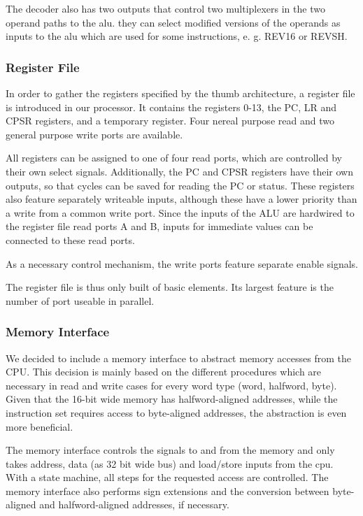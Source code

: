 The decoder also has two outputs that control two multiplexers in the two operand paths to the alu. they can select modified versions of the operands as inputs to the alu which are used for some instructions, e. g. REV16 or REVSH.

\subsubsection{Register File}
\label{subsubsec:regfisterfile}
In order to gather the registers specified by the thumb architecture, a register file is introduced in our processor. It contains the registers 0-13, the PC, LR and CPSR registers, and a temporary register. Four nereal purpose read and two general purpose write ports are available.

All registers can be assigned to one of four read ports, which are controlled by their own select signals. Additionally, the PC and CPSR registers have their own outputs, so that cycles can be saved for reading the PC or status. These registers also feature separately writeable inputs, although these have a lower priority than a write from a common write port.
Since the inputs of the ALU are hardwired to the register file read ports A and B, inputs for immediate values can be connected to these read ports.

As a necessary control mechanism, the write ports feature separate enable signals. 

The register file is thus only built of basic elements. Its largest feature is the number of port useable in parallel. 

\subsubsection{Memory Interface}
\label{subsubsec:memoryinterface}
We decided to include a memory interface to abstract memory accesses from the CPU. This decision is mainly based on the different procedures which are necessary in read and write cases for every word type (word, halfword, byte). Given that the 16-bit wide memory has halfword-aligned addresses, while the instruction set requires access to byte-aligned addresses, the abstraction is even more beneficial. 

The memory interface controls the signals to and from the memory and only takes address, data (as 32 bit wide bus) and load/store inputs from the cpu. With a state machine, all steps for the requested access are controlled. The memory interface also performs sign extensions and the conversion between byte-aligned and halfword-aligned addresses, if necessary.

